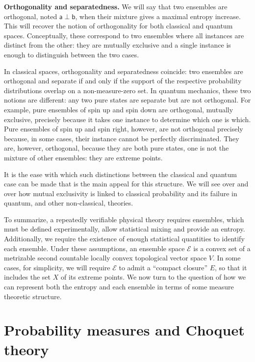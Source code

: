 \documentclass[10pt,twocolumn, nofootinbib]{revtex4-2}
\newcommand{\ens}[1][e] {\mathsf{#1}} %
\newcommand{\Ens}[1][E] {\mathcal{#1}} %
\def\ortho{\perp}
\begin{document}
\textbf{Orthogonality and separatedness.} We will say that two ensembles are orthogonal, noted $\ens[a] \ortho \ens[b]$, when their mixture gives a maximal entropy increase. This will recover the notion of orthogonality for both classical and quantum spaces. Conceptually, these correspond to two ensembles where all instances are distinct from the other: they are mutually exclusive and a single instance is enough to distinguish between the two cases. 

In classical spaces, orthogonality and separatedness coincide: two ensembles are orthogonal and separate if and only if the support of the respective probability distributions overlap on a non-measure-zero set. In quantum mechanics, these two notions are different: any two pure states are separate but are not orthogonal. For example, pure ensembles of spin up and spin down are orthogonal, mutually exclusive, precisely because it takes one instance to determine which one is which. Pure ensembles of spin up and spin right, however, are not orthogonal precisely because, in some cases, their instance cannot be perfectly discriminated. They are, however, orthogonal, because they are both pure states, one is not the mixture of other ensembles: they are extreme points.

It is the ease with which such distinctions between the classical and quantum case can be made that is the main appeal for this structure. We will see over and over how mutual exclusivity is linked to classical probability and its failure in quantum, and other non-classical, theories.

To summarize, a repeatedly verifiable physical theory requires ensembles, which must be defined experimentally, allow statistical mixing and provide an entropy. Additionally, we require the existence of enough statistical quantities to identify each ensemble. Under these assumptions, an ensemble space $\Ens$ is a convex set of a metrizable second countable locally convex topological vector space $V$. In some cases, for simplicity, we will require $\Ens$ to admit a ``compact closure'' $E$, so that it includes the set $X$ of its extreme points. We now turn to the question of how we can represent both the entropy and each ensemble in terms of some measure theoretic structure.

\section{Probability measures and Choquet theory}
\end{document}
